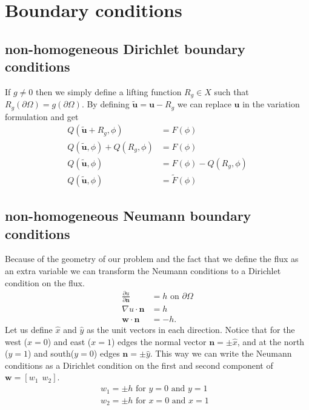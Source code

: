 \section{Boundary conditions}
\subsection{non-homogeneous Dirichlet boundary conditions}
If $g \neq 0$ then we simply define a lifting function $R_g \in X$ such that $R_g(\partial \Omega) = g(\partial \Omega)$. By defining $\tilde{\mathbf{u}}=\mathbf{u}-R_g$ we can replace $\mathbf{u}$ in the variation formulation and get 
\begin{align}
	Q(\tilde{\mathbf{u}}+R_g,\phi) &= F(\phi) \\
	Q(\tilde{\mathbf{u}},\phi)+Q(R_g,\phi) &= F(\phi) \\
	Q(\tilde{\mathbf{u}},\phi) &= F(\phi) - Q(R_g,\phi)\\
	Q(\tilde{\mathbf{u}},\phi) &= \tilde{F}(\phi) 
	\label{eq:liftingFunc}
\end{align}
%
\subsection{non-homogeneous Neumann boundary conditions}
Because of the geometry of our problem and the fact that we define the flux as an extra variable we can transform the Neumann conditions to a Dirichlet condition on the flux. 
\begin{align}
	\frac{\partial u}{\partial \mathbf{n}} &= h \text{  on   } \partial \Omega \\
	\nabla u \cdot \mathbf{n} &= h \\
	 \mathbf{w} \cdot \mathbf{n} &= -h. 
	\label{eq:neumann}
\end{align}
Let us define $\hat{x}$ and $\hat{y}$ as the unit vectors in each direction. Notice that for the west ($x=0$) and east ($x=1$) edges the normal vector $\mathbf{n}= \pm\hat{x}$, and at the north ($y=1$) and south($y=0$) edges $\mathbf{n}=\pm \hat{y}$. This way we can write the Neumann conditions as a Dirichlet condition on the first and second component of $\mathbf{w}= [ w_1 \:\: w_2]$. 
\begin{align}
	w_1 = \pm h \text{    for $y = 0$ and $y=1$ }\\
	w_2 = \pm h \text{    for $x = 0$ and $x=1$ }
	\label{eq:neumannAsDirichlet}
\end{align}
